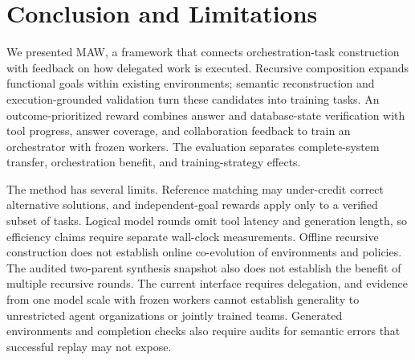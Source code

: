 \section{Conclusion and Limitations}
\label{sec:conclusion}

We presented MAW, a framework that connects orchestration-task construction with feedback on how delegated work is executed. Recursive composition expands functional goals within existing environments; semantic reconstruction and execution-grounded validation turn these candidates into training tasks. An outcome-prioritized reward combines answer and database-state verification with tool progress, answer coverage, and collaboration feedback to train an orchestrator with frozen workers. The evaluation separates complete-system transfer, orchestration benefit, and training-strategy effects. 

The method has several limits. Reference matching may under-credit correct alternative solutions, and independent-goal rewards apply only to a verified subset of tasks. Logical model rounds omit tool latency and generation length, so efficiency claims require separate wall-clock measurements. Offline recursive construction does not establish online co-evolution of environments and policies. The audited two-parent synthesis snapshot also does not establish the benefit of multiple recursive rounds. The current interface requires delegation, and evidence from one model scale with frozen workers cannot establish generality to unrestricted agent organizations or jointly trained teams. Generated environments and completion checks also require audits for semantic errors that successful replay may not expose.
